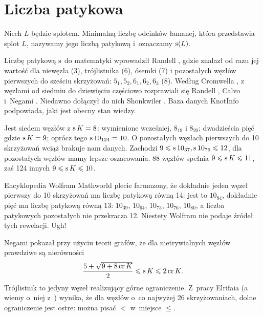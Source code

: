 
\section{Liczba patykowa}
%


\begin{definition}
    Niech $L$ będzie splotem.
    Minimalną liczbę odcinków łamanej, która przedstawia splot $L$, nazywamy jego liczbą patykową i~oznaczamy $\operatorname{s}(L)$.
\end{definition}

Liczbę patykową $\operatorname{s}$ do matematyki wprowadził Randell \cite{randell1994}, gdzie znalazł od razu jej wartość dla niewęzła (3), trójlistnika (6), ósemki (7) i pozostałych węzłów pierwszych do sześciu skrzyżowań: $5_1, 5_2, 6_1, 6_2, 6_3$ (8).
%
Według Cromwella \cite{cromwell2004}, z węzłami od siedmiu do dziewięciu częściowo rozprawiali się Randell \cite{randell1994}, Calvo \cite{calvo1998} i~Negami \cite{negami1991}.
%
%
%
Niedawno dołączył do nich Shonkwiler \cite{shonkwiler2022}.
%
Baza danych KnotInfo podpowiada, jaki jest obecny stan wiedzy.

Jest siedem węzłów z $\operatorname{s} K = 8$: wymienione wcześniej, $8_{19}$ i $8_{20}$;
dwadzieścia pięć gdzie $\operatorname{s} K = 9$; oprócz tego $\operatorname{s} 10_{124} = 10$.
O pozostałych węzłach pierwszych do 10 skrzyżowań wciąż brakuje nam danych.
Zachodzi $9 \leqslant \operatorname{s} 10_{37}, \operatorname{s} 10_{76} \leqslant 12$, dla pozostałych węzłów mamy lepsze oszacowania.
88 węzłów spełnia $9 \leqslant \operatorname{s} K \leqslant 11$, zaś 124 innych $9 \leqslant \operatorname{s} K \leqslant 10$.

Encyklopedia Wolfram Mathworld plecie farmazony, że dokładnie jeden węzeł pierwszy do 10 skrzyżowań ma liczbę patykową równą 14: jest to $10_{84}$, dokładnie pięć ma liczbę patykową równą 13: $10_{39}$, $10_{64}$, $10_{73}$, $10_{76}$, $10_{80}$, a liczba patykowych pozostałych nie przekracza 12.
Niestety Wolfram nie podaje źródeł tych rewelacji.
Ugh!

Negami \cite{negami1991} pokazał przy użyciu teorii grafów, że dla nietrywialnych węzłów prawdziwe są nierówności
%
\begin{equation}
    \frac{5+\sqrt{9 + 8 \operatorname{cr} K}}{2} \leqslant \operatorname{s} K \leqslant 2 \operatorname{cr} K.
\end{equation}
Trójlistnik to jedyny węzeł realizujący górne ograniczenie.
Z~pracy Elrifaia \cite{elrifai2006} (a wiemy o~niej z~\cite{huh2011}) wynika, że dla węzłów o~co najwyżej 26 skrzyżowaniach, dolne ograniczenie jest ostre: można pisać $<$ w~miejsce $\le$.
%

